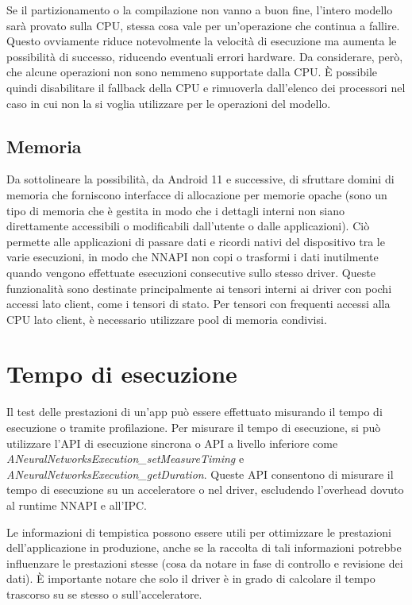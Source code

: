 Se il partizionamento o la compilazione non vanno a buon fine, l’intero modello sarà provato sulla CPU, stessa cosa vale per un’operazione che continua a fallire. Questo ovviamente riduce notevolmente la velocità
di esecuzione ma aumenta le possibilità di successo, riducendo eventuali errori hardware. Da considerare, però, che alcune operazioni non sono nemmeno supportate dalla CPU.
È possibile quindi disabilitare il fallback della CPU e rimuoverla dall’elenco dei processori nel caso in cui non la si voglia utilizzare per le operazioni del modello.

\subsection{Memoria}
Da sottolineare la possibilità, da Android 11 e successive, di sfruttare domini di memoria che forniscono interfacce di allocazione per memorie opache (sono un tipo di memoria che è gestita in modo che i dettagli interni non siano
direttamente accessibili o modificabili dall'utente o dalle applicazioni). Ciò permette alle applicazioni di passare dati e ricordi nativi del dispositivo tra le varie esecuzioni, in modo che NNAPI non copi o trasformi i dati
inutilmente quando vengono effettuate esecuzioni consecutive sullo stesso driver.
Queste funzionalità sono destinate principalmente ai tensori interni ai driver con pochi accessi lato client, come i tensori di stato. Per tensori con frequenti accessi alla CPU lato client, è necessario utilizzare pool di memoria condivisi.

\section{Tempo di esecuzione}
Il test delle prestazioni di un'app può essere effettuato misurando il tempo di esecuzione o tramite profilazione. Per misurare il tempo di esecuzione, si può utilizzare l'API di esecuzione sincrona o API a livello inferiore
come \textit{ANeuralNetworksExecution\_setMeasureTiming} e \textit{ANeuralNetworksExecution\_getDuration}. Queste API consentono di misurare il tempo di esecuzione su un acceleratore o nel driver, escludendo l'overhead dovuto al runtime NNAPI
e all'IPC.

Le informazioni di tempistica possono essere utili per ottimizzare le prestazioni dell'applicazione in produzione, anche se la raccolta di tali informazioni potrebbe influenzare le prestazioni stesse (cosa da notare in fase di
controllo e revisione dei dati). È importante notare che solo il driver è in grado di calcolare il tempo trascorso su se stesso o sull'acceleratore.

